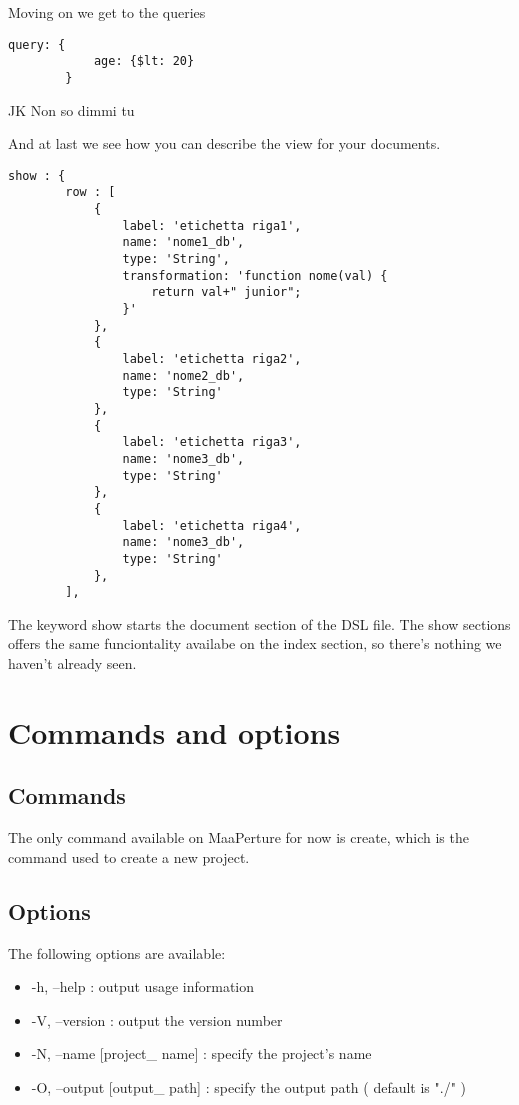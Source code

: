 Moving on we get to the queries

\begin{lstlisting}
query: {
			age: {$lt: 20}
		}
\end{lstlisting}
JK Non so dimmi tu


And at last we see how you can describe the view for your documents.

\begin{lstlisting}
show : {
		row : [
			{
				label: 'etichetta riga1',
				name: 'nome1_db',
				type: 'String',
				transformation: 'function nome(val) {	
					return val+" junior";				
				}'
			},
			{	
				label: 'etichetta riga2',
				name: 'nome2_db',
				type: 'String'
			},
			{	
				label: 'etichetta riga3',
				name: 'nome3_db',
				type: 'String'
			},
			{	
				label: 'etichetta riga4',
				name: 'nome3_db',
				type: 'String'
			},
		],

\end{lstlisting}



The keyword show starts the document section of the DSL file.
The show sections offers the same funciontality availabe on the index section, so there's nothing we haven't already seen.


\section{Commands and options}

\subsection{Commands}
\label{commands}
The only command available on MaaPerture for now is create, which is the command used to create a new project.

\subsection{Options}
\label{options}
The following options are available:
\begin{itemize}
\item -h, --help    :              output usage information
\item -V, --version  :             output the version number
\item -N, --name [project\_ name] :  specify the project's name
\item -O, --output [output\_ path] : specify the output path ( default is "./" )
\end{itemize}


